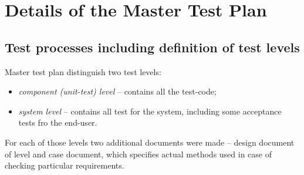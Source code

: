 \chapter{Details of the Master Test Plan} \label{chp:details-of-the-master-test-plan}
	\begin{comment}
		$<$Introduce the following subordinate sections. This section describes the test processes, test documentation requirements, and test reporting requirements for the entire test effort. $>$
	\end{comment}
	
\section{Test processes including definition of test levels} \label{s:details-of-the-master-test-plan:test-processes-including-definition-of-test-levels}
	\begin{comment}
		$<$ Identify test activities and tasks to be performed for each of the test processes described in Clause 5 of this standard (or the alternative test processes defined by the user of this standard), and document those test activities and tasks. Provide an overview of the test activities and tasks for all development life cycle processes. Identify the number and sequence of levels of test. There may be a different number of levels than the example used in this standard (component, component integration, system, and acceptance). Integration is often accomplished through a series of test levels, for both component integration and systems integration. Examples of possible additional test levels include security, usability, performance, stress, recovery, and regression. Small systems may have fewer levels of test, e.g., combining system and acceptance. If the test processes are already defined by an organization’s standards, a reference to those standards could be substituted for the contents of this subclause.$>$
	\end{comment}
	Master test plan distinguish two test levels:
	\begin{itemize}
		\item
		{
			\emph{component (unit-test) level} -- contains all the test-code;	
		}
		\item
		{
			\emph{system level} -- contains all test for the system, including some acceptance tests fro the end-user.
		}
	\end{itemize}
	For each of those levels two additional documents were made -- design document of level and case document, which specifies actual methods used in case of checking particular requirements.
